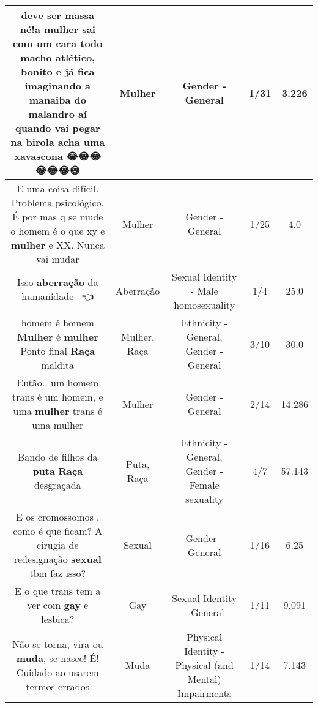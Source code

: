 \documentclass[11pt]{article}
\newlength\mylength
\begin{document}
\begin{center}
\begin{longtable}{|C{.65\mylength}|C{.30\mylength}|C{.12\mylength}|C{.12\mylength}|C{.12\mylength}|}
  \small deve ser massa né!a \textbf{mulher} sai com um cara todo macho atlético, bonito e já fica imaginando a manaiba do malandro aí quando vai pegar na birola acha uma xavascona 😂😂😂😂😂😂😅\normalsize   & Mulher & Gender - General & 1/31 & 3.226 \\  \hline
  \small E uma coisa difícil. Problema psicológico. É por mas q se mude o homem é o que xy e \textbf{mulher} e XX. Nunca vai mudar\normalsize   & Mulher & Gender - General & 1/25 & 4.0 \\  \hline
  \small Isso \textbf{aberração} da humanidade💩💩💩👈\normalsize   & Aberração & Sexual Identity - Male homosexuality & 1/4 & 25.0 \\  \hline
  \small homem é homem \textbf{Mulher} é \textbf{mulher} Ponto final \textbf{Raça} maldita\normalsize   & Mulher, Raça & Ethnicity - General, Gender - General & 3/10 & 30.0 \\  \hline
  \small Então.. um homem trans é um homem, e uma \textbf{mulher} trans é uma mulher\normalsize   & Mulher & Gender - General & 2/14 & 14.286 \\  \hline
  \small Bando de filhos da \textbf{puta} \textbf{Raça} desgraçada\normalsize   & Puta, Raça & Ethnicity - General, Gender - Female sexuality & 4/7 & 57.143 \\  \hline
  \small E os cromossomos , como é que ficam? A cirugia de redesignação \textbf{sexual} tbm faz isso?\normalsize   & Sexual & Gender - General & 1/16 & 6.25 \\  \hline
  \small E o que trans tem a ver com \textbf{gay} e lesbica?\normalsize   & Gay & Sexual Identity - General & 1/11 & 9.091 \\  \hline
  \small Não se torna, vira ou \textbf{muda}, se nasce! É! Cuidado ao usarem termos errados\normalsize   & Muda & Physical Identity - Physical (and Mental) Impairments & 1/14 & 7.143 \\  \hline

\end{longtable}
\end{center}
\end{document}
